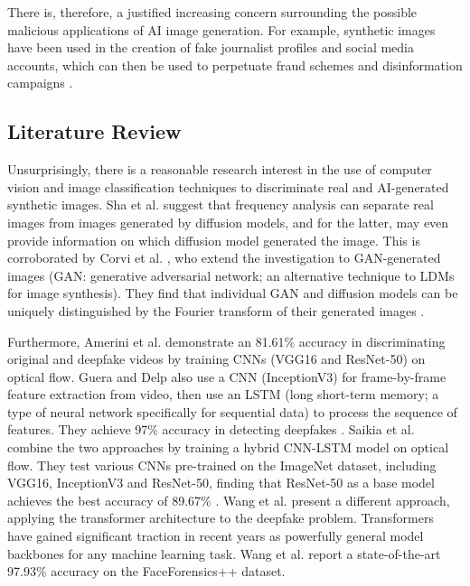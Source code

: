 There is, therefore, a justified increasing concern surrounding the possible malicious applications of AI image generation. For example, synthetic images have been used in the creation of fake journalist profiles and social media accounts, which can then be used to perpetuate fraud schemes and disinformation campaigns \cite{khoo_2021}.

\subsection{Literature Review}

Unsurprisingly, there is a reasonable research interest in the use of computer vision and image classification techniques to discriminate real and AI-generated synthetic images. Sha et al. \cite{sha_2023} suggest that frequency analysis can separate real images from images generated by diffusion models, and for the latter, may even provide information on which diffusion model generated the image. This is corroborated by Corvi et al. \cite{corvi_2022}, who extend the investigation to GAN-generated images (GAN: generative adversarial network; an alternative technique to LDMs for image synthesis). They find that individual GAN and diffusion models can be uniquely distinguished by the Fourier transform of their generated images \cite{corvi_2022}.

Furthermore, Amerini et al. \cite{amerini_2019} demonstrate an 81.61\% accuracy in discriminating original and deepfake videos by training CNNs (VGG16 and ResNet-50) on optical flow. Guera and Delp \cite{guera_2018} also use a CNN (InceptionV3) for frame-by-frame feature extraction from video, then use an LSTM (long short-term memory; a type of neural network specifically for sequential data) to process the sequence of features. They achieve 97\% accuracy in detecting deepfakes \cite{guera_2018}. Saikia et al. \cite{saikia_2022} combine the two approaches by training a hybrid CNN-LSTM model on optical flow. They test various CNNs pre-trained on the ImageNet dataset, including VGG16, InceptionV3 and ResNet-50, finding that ResNet-50 as a base model achieves the best accuracy of 89.67\% \cite{saikia_2022}. Wang et al. \cite{wang_2022} present a different approach, applying the transformer architecture to the deepfake problem. Transformers have gained significant traction in recent years as powerfully general model backbones for any machine learning task. Wang et al. \cite{wang_2022} report a state-of-the-art 97.93\% accuracy on the FaceForensics++ dataset.

